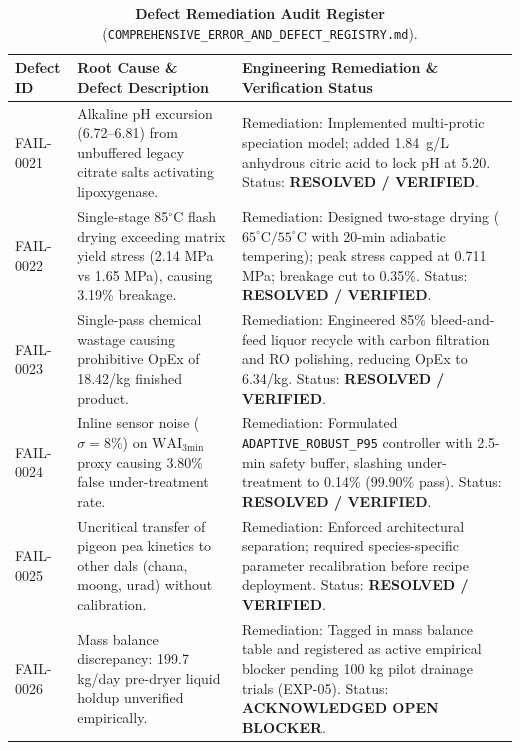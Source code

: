 \documentclass[10pt,a4paper]{article}
\newcommand{\inr}{\text{INR~}}
\begin{document}
\begin{table}[H]
\centering
\footnotesize
\setlength{\tabcolsep}{3.0pt}
\caption{\textbf{Defect Remediation Audit Register} (\texttt{COMPREHENSIVE\_ERROR\_AND\_DEFECT\_REGISTRY.md}).}
\label{tab:defect_remediation}
\begin{tabularx}{\linewidth}{p{2.2cm}p{3.8cm}>{\raggedright\arraybackslash}X}
\toprule
\textbf{Defect ID} & \textbf{Root Cause \& Defect Description} & \textbf{Engineering Remediation \& Verification Status} \\
\midrule
FAIL-0021 & Alkaline pH excursion (6.72--6.81) from unbuffered legacy citrate salts activating lipoxygenase. & Remediation: Implemented multi-protic speciation model; added 1.84~g/L anhydrous citric acid to lock pH at 5.20. Status: \textbf{RESOLVED / VERIFIED}. \\
FAIL-0022 & Single-stage 85$^\circ$C flash drying exceeding matrix yield stress (2.14 MPa vs 1.65 MPa), causing 3.19\% breakage. & Remediation: Designed two-stage drying ($65^\circ\mathrm{C} / 55^\circ\mathrm{C}$ with 20-min adiabatic tempering); peak stress capped at 0.711 MPa; breakage cut to 0.35\%. Status: \textbf{RESOLVED / VERIFIED}. \\
FAIL-0023 & Single-pass chemical wastage causing prohibitive OpEx of \inr18.42/kg finished product. & Remediation: Engineered 85\% bleed-and-feed liquor recycle with carbon filtration and RO polishing, reducing OpEx to \inr6.34/kg. Status: \textbf{RESOLVED / VERIFIED}. \\
FAIL-0024 & Inline sensor noise ($\sigma=8\%$) on $\mathrm{WAI}_{\mathrm{3min}}$ proxy causing 3.80\% false under-treatment rate. & Remediation: Formulated \texttt{ADAPTIVE\_ROBUST\_P95} controller with 2.5-min safety buffer, slashing under-treatment to 0.14\% ($99.90\%$ pass). Status: \textbf{RESOLVED / VERIFIED}. \\
FAIL-0025 & Uncritical transfer of pigeon pea kinetics to other dals (chana, moong, urad) without calibration. & Remediation: Enforced architectural separation; required species-specific parameter recalibration before recipe deployment. Status: \textbf{RESOLVED / VERIFIED}. \\
FAIL-0026 & Mass balance discrepancy: 199.7 kg/day pre-dryer liquid holdup unverified empirically. & Remediation: Tagged in mass balance table and registered as active empirical blocker pending 100 kg pilot drainage trials (EXP-05). Status: \textbf{ACKNOWLEDGED OPEN BLOCKER}. \\
\bottomrule
\end{tabularx}
\end{table}
\end{document}
